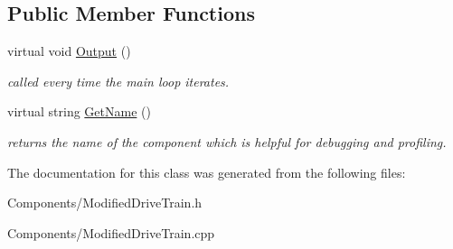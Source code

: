 \subsection*{\-Public \-Member \-Functions}
\begin{DoxyCompactItemize}
\item 
\hypertarget{class_modified_drive_train_a02e6460b8dc65be0df9712f05f13d56f}{
virtual void \hyperlink{class_modified_drive_train_a02e6460b8dc65be0df9712f05f13d56f}{\-Output} ()}
\label{class_modified_drive_train_a02e6460b8dc65be0df9712f05f13d56f}

\begin{DoxyCompactList}\small\item\em called every time the main loop iterates. \end{DoxyCompactList}\item 
\hypertarget{class_modified_drive_train_a31c4714cecbde939346e2d3c5db5d3a6}{
virtual string \hyperlink{class_modified_drive_train_a31c4714cecbde939346e2d3c5db5d3a6}{\-Get\-Name} ()}
\label{class_modified_drive_train_a31c4714cecbde939346e2d3c5db5d3a6}

\begin{DoxyCompactList}\small\item\em returns the name of the component which is helpful for debugging and profiling. \end{DoxyCompactList}\end{DoxyCompactItemize}


\-The documentation for this class was generated from the following files\-:\begin{DoxyCompactItemize}
\item 
\-Components/\-Modified\-Drive\-Train.\-h\item 
\-Components/\-Modified\-Drive\-Train.\-cpp\end{DoxyCompactItemize}
